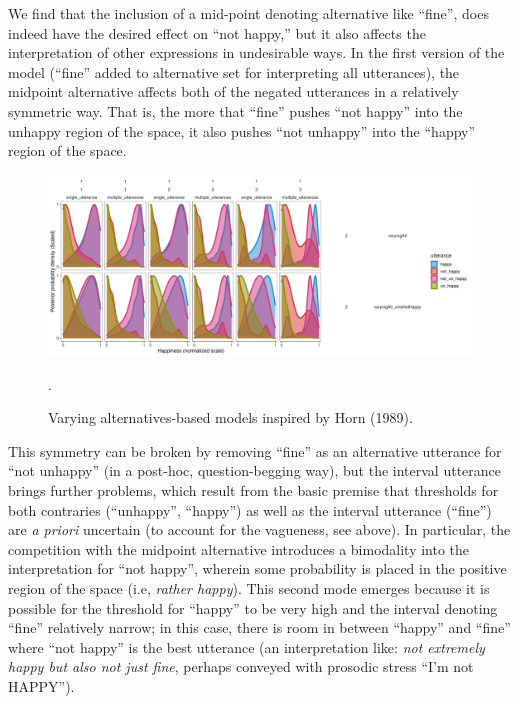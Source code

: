 \documentclass[floatsintext,doc]{apa6}
\begin{document}
We find that the inclusion of a mid-point denoting alternative like ``fine'', does indeed have
the desired effect on ``not happy,'' but it also affects the interpretation of other
expressions in undesirable ways.
In the first version of the model (``fine'' added to alternative set for interpreting all utterances), the midpoint alternative affects both of the negated utterances in a relatively symmetric way.
That is, the more that ``fine'' pushes ``not happy'' into the unhappy region of the space, it also pushes ``not unhappy'' into the ``happy'' region of the space. 

\begin{figure}[t]
\centering \includegraphics{figs/horn_models.pdf} 
\caption{Varying alternatives-based models inspired by Horn (1989). }.\label{fig:horn}
\end{figure}


This symmetry can be broken by removing ``fine'' as an alternative utterance for ``not
unhappy'' (in a post-hoc, question-begging way), but the interval utterance brings further
problems, which result from the basic premise that thresholds for both contraries (``unhappy'',
``happy'') as well as the interval utterance (``fine'') are \emph{a priori} uncertain (to account for the vagueness, see above). 
In particular, the competition with the midpoint alternative introduces a bimodality into the interpretation for ``not happy'', wherein some probability is placed in the positive region of the space (i.e, \emph{rather happy}).
This second mode emerges because it is possible for the threshold for ``happy'' to be very high and the interval denoting ``fine'' relatively narrow; in this case, there is room in between ``happy'' and ``fine'' where ``not happy'' is the best utterance (an interpretation like: \emph{not extremely happy but also not just fine}, perhaps conveyed with prosodic stress ``I'm not HAPPY''). 
\end{document}
